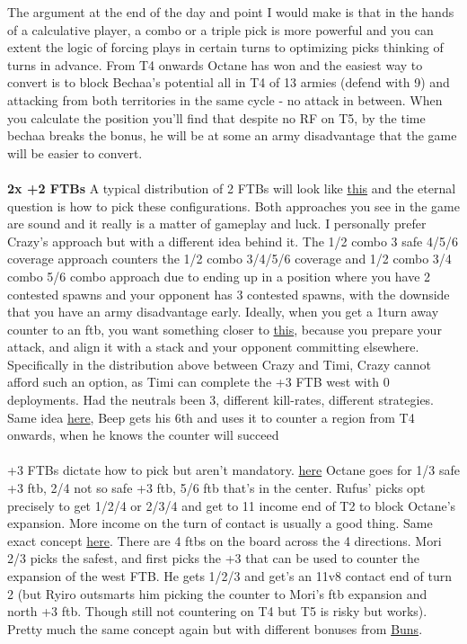 The argument at the end of the day and point I would make is that in the hands of a calculative player, a combo or a triple pick is more powerful and you can extent the logic of forcing plays in certain turns to optimizing picks thinking of turns in advance.  From T4 onwards Octane has won and the easiest way to convert is to block Bechaa's potential all in T4 of 13 armies (defend with 9) and attacking from both territories in the same cycle - no attack in between. When you calculate the position you'll find that despite no RF on T5, by the time bechaa breaks the bonus, he will be at some an army disadvantage that the game will be easier to convert.
\\
\\
\textbf{2x +2 FTBs}
A typical distribution of 2 FTBs will look like \href{https://www.warzone.com/MultiPlayer?GameID=32247185}{this} and the eternal question is how to pick these configurations. Both approaches you see in the game are sound and it really is a matter of gameplay and luck. I personally prefer Crazy's approach but with a different idea behind it. The 1/2 combo 3 safe 4/5/6 coverage approach counters the 1/2 combo 3/4/5/6 coverage and 1/2 combo 3/4 combo 5/6 combo approach due to ending up in a position where you have 2 contested spawns and your opponent has 3 contested spawns, with the downside that you have an army disadvantage early. Ideally, when you get a 1turn away counter to an ftb, you want something closer to \href{https://www.warzone.com/MultiPlayer?GameID=36672825}{this}, because you prepare your attack, and align it with a stack and your opponent committing elsewhere. Specifically in the distribution above between Crazy and Timi, Crazy cannot afford such an option, as Timi can complete the +3 FTB west with 0 deployments. Had the neutrals been 3, different kill-rates, different strategies. Same idea \href{https://www.warzone.com/MultiPlayer?GameID=26364060}{here}, Beep gets his 6th and uses it to counter a region from T4 onwards, when he knows the counter will succeed
\\
\\
+3 FTBs dictate how to pick but aren't mandatory. \href{https://www.warzone.com/MultiPlayer?GameID=25238378}{here} Octane goes for 1/3 safe +3 ftb, 2/4 not so safe +3 ftb, 5/6 ftb that's in the center. Rufus' picks opt precisely to get 1/2/4 or 2/3/4 and get to 11 income end of T2 to block Octane's expansion. More income on the turn of contact is usually a good thing. Same exact concept \href{https://www.warzone.com/MultiPlayer?GameID=30348571}{here}. There are 4 ftbs on the board across the 4 directions. Mori 2/3 picks the safest, and first picks the +3 that can be used to counter the expansion of the west FTB. He gets 1/2/3 and get's an 11v8 contact end of turn 2 (but Ryiro outsmarts him picking the counter to Mori's ftb expansion and north +3 ftb. Though still not countering on T4 but T5 is risky but works). Pretty much the same concept again but with different bonuses from \href{https://www.warzone.com/MultiPlayer?GameID=30699151}{Buns}.
